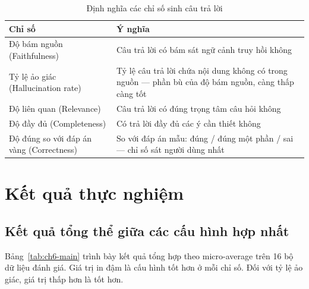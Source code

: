 \documentclass[../DoAn.tex]{subfiles}
\begin{document}
\begin{table}[H]
\centering
\small
\begin{tabular}{|p{3.6cm}|p{10.1cm}|}
\hline
\textbf{Chỉ số} & \textbf{Ý nghĩa} \\
\hline
Độ bám nguồn (Faithfulness) & Câu trả lời có bám sát ngữ cảnh truy hồi không \\
\hline
Tỷ lệ ảo giác (Hallucination rate) & Tỷ lệ câu trả lời chứa nội dung không có trong nguồn --- phần bù của độ bám nguồn, càng thấp càng tốt \\
\hline
Độ liên quan (Relevance) & Câu trả lời có đúng trọng tâm câu hỏi không \\
\hline
Độ đầy đủ (Completeness) & Có trả lời đầy đủ các ý cần thiết không \\
\hline
Độ đúng so với đáp án vàng (Correctness) & So với đáp án mẫu: đúng / đúng một phần / sai --- chỉ số sát người dùng nhất \\
\hline
\end{tabular}
\caption{Định nghĩa các chỉ số sinh câu trả lời}
\label{tab:ch6-e2e-metrics}
\end{table}

\section{Kết quả thực nghiệm}

\subsection{Kết quả tổng thể giữa các cấu hình hợp nhất}

Bảng~\ref{tab:ch6-main} trình bày kết quả tổng hợp theo micro-average trên
16 bộ dữ liệu đánh giá. Giá trị in đậm là cấu hình tốt
hơn ở mỗi chỉ số. Đối với tỷ lệ ảo giác, giá trị thấp hơn là tốt hơn.
\end{document}
